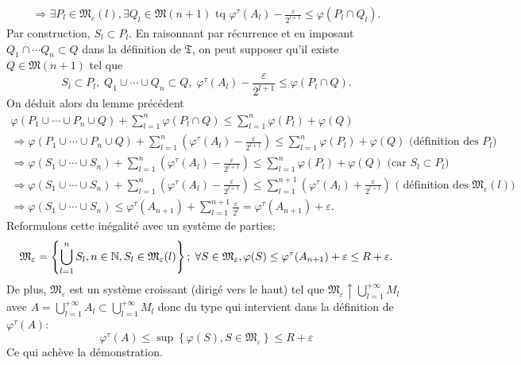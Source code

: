 \begin{demo}
\begin{multline*}
 \Rightarrow \exists P_l \in \mathfrak{M}_\varepsilon(l), \exists Q_l \in \mathfrak{M}(n+1) \text{ tq }
     \varphi^\tau(A_l) - \frac{\varepsilon}{2^{l+1}} \leq \varphi(P_l \cap Q_l) .
\end{multline*}
Par construction, $S_l \subset P_l$. En raisonnant par récurrence et en imposant $Q_1 \cap \cdots Q_n \subset Q$ dans la définition de $\mathfrak{T}$, on peut supposer qu'il existe $Q \in \mathfrak{M}(n+1)$ tel que
\begin{displaymath}
 S_l \subset P_l, \; Q_1 \cup \cdots \cup Q_n \subset Q, \; \varphi^\tau(A_l) - \frac{\varepsilon}{2^{l+1}} \leq \varphi(P_l \cap Q).
\end{displaymath}
On déduit alors du lemme précédent
\begin{multline*}
 \varphi(P_1 \cup \cdots \cup P_n \cup Q) + \sum_{l=1}^n \varphi(P_l \cap Q) \leq \sum_{l=1}^n \varphi(P_l) + \varphi(Q) \\
 \Rightarrow
 \varphi(P_1 \cup \cdots \cup P_n \cup Q) + \sum_{l=1}^n \left( \varphi^\tau(A_l) - \frac{\varepsilon}{2^{l+1}} \right) \leq \sum_{l=1}^n \varphi(P_l) + \varphi(Q)\text{   (définition des $P_l$)}\\
  \Rightarrow
 \varphi(S_1 \cup \cdots \cup S_n) + \sum_{l=1}^n \left( \varphi^\tau(A_l) - \frac{\varepsilon}{2^{l+1}} \right) \leq \sum_{l=1}^n \varphi(P_l) + \varphi(Q)\text{   (car $S_l \subset P_l$)} \\
  \Rightarrow
 \varphi(S_1 \cup \cdots \cup S_n) + \sum_{l=1}^n \left( \varphi^\tau(A_l) - \frac{\varepsilon}{2^{l+1}} \right)
 \leq \sum_{l=1}^{n+1} \left( \varphi^\tau(A_l) + \frac{\varepsilon}{2^{l+1}}\right)\text{   ( définition des $\mathfrak{M}_\varepsilon(l)$)} \\
  \Rightarrow
 \varphi(S_1 \cup \cdots \cup S_n) \leq \varphi^\tau(A_{n+1}) + \sum_{l=1}^{n+1}\frac{\varepsilon}{2^{l}}
  = \varphi^\tau(A_{n+1}) + \varepsilon.
\end{multline*}
Reformulons cette inégalité avec un système de parties:
\begin{displaymath}
 \mathfrak{M}_\varepsilon = \left\lbrace \bigcup_{l =1} ^n S_l, n \in \mathbb{N}, S_l \in \mathfrak{M}_\varepsilon(l) \right\rbrace;\;
 \forall S \in \mathfrak{M}_\varepsilon, \varphi(S) \leq \varphi^\tau(A_{n+1}) + \varepsilon \leq R + \varepsilon .
\end{displaymath}
De plus, $\mathfrak{M}_\varepsilon$ est un système croissant (dirigé vers le haut) tel que $\mathfrak{M}_\varepsilon\uparrow \bigcup_{l =1} ^{+\infty} M_l$ avec $A = \bigcup_{l =1}^{+\infty} A_l \subset \bigcup_{l =1}^{+\infty} M_l$ donc du type qui intervient dans la définition de $\varphi^\tau(A)$:
\begin{displaymath}
 \varphi^\tau(A) \leq \sup\left\lbrace \varphi(S), S \in \mathfrak{M}_\varepsilon \right\rbrace \leq R + \varepsilon
\end{displaymath}
Ce qui achève la démonstration.
\end{demo}


